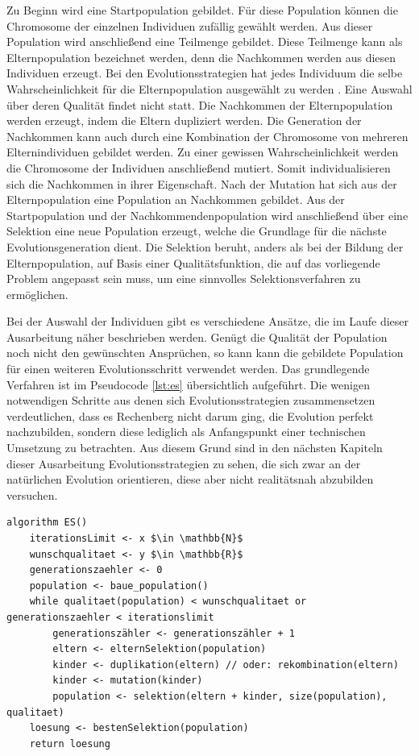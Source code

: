 Zu Beginn wird eine Startpopulation gebildet. Für diese Population können die Chromosome der einzelnen Individuen zufällig gewählt werden. Aus dieser Population wird anschließend eine Teilmenge gebildet. Diese Teilmenge kann als Elternpopulation bezeichnet werden, denn die Nachkommen werden aus diesen Individuen erzeugt. Bei den Evolutionsstrategien hat jedes Individuum die selbe Wahrscheinlichkeit für die Elternpopulation ausgewählt zu werden \cite[S.220]{schoeneburg}. Eine Auswahl über deren Qualität findet nicht statt. Die Nachkommen der Elternpopulation werden erzeugt, indem die Eltern dupliziert werden. Die Generation der Nachkommen kann auch durch eine Kombination der Chromosome von mehreren Elternindividuen gebildet werden. Zu einer gewissen Wahrscheinlichkeit werden die Chromosome der Individuen anschließend mutiert. Somit individualisieren sich die Nachkommen in ihrer Eigenschaft. 
Nach der Mutation hat sich aus der Elternpopulation eine Population an Nachkommen gebildet. Aus der Startpopulation und der Nachkommendenpopulation wird anschließend über eine Selektion eine neue Population erzeugt, welche die Grundlage für die nächste Evolutionsgeneration dient. Die Selektion beruht, anders als bei der Bildung der Elternpopulation, auf Basis einer Qualitätsfunktion, die auf das vorliegende Problem angepasst sein muss, um eine sinnvolles Selektionsverfahren zu ermöglichen.

Bei der Auswahl der Individuen gibt es verschiedene Ansätze, die im Laufe dieser Ausarbeitung näher beschrieben werden. Genügt die Qualität der Population noch nicht den gewünschten Ansprüchen, so kann kann die gebildete Population für einen weiteren Evolutionsschritt verwendet werden.
Das grundlegende Verfahren ist im Pseudocode \ref{lst:es} übersichtlich aufgeführt. Die wenigen notwendigen Schritte aus denen sich Evolutionsstrategien zusammensetzen verdeutlichen, dass es Rechenberg nicht darum ging, die Evolution perfekt nachzubilden, sondern diese lediglich als Anfangspunkt einer technischen Umsetzung zu betrachten. Aus diesem Grund sind in den nächsten Kapiteln dieser Ausarbeitung Evolutionsstrategien zu sehen, die sich zwar an der natürlichen Evolution orientieren, diese aber nicht realitätsnah abzubilden versuchen.

\pagebreak

\begin{lstlisting}[caption={Grundlegende Evolutionsstrategie}, firstnumber=1, captionpos=b, label=lst:es]
algorithm ES()
	iterationsLimit <- x $\in \mathbb{N}$
	wunschqualitaet <- y $\in \mathbb{R}$
	generationszaehler <- 0
	population <- baue_population()
	while qualitaet(population) < wunschqualitaet or generationszaehler < iterationslimit
		generationszähler <- generationszähler + 1
		eltern <- elternSelektion(population)
		kinder <- duplikation(eltern) // oder: rekombination(eltern)
		kinder <- mutation(kinder)
		population <- selektion(eltern + kinder, size(population), qualitaet)
	loesung <- bestenSelektion(population)
	return loesung
\end{lstlisting}

